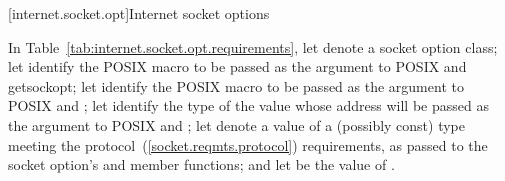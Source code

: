 [internet.socket.opt]{Internet socket options}

\pnum
In Table~\ref{tab:internet.socket.opt.requirements}, let  denote a socket option class; let  identify the POSIX macro to be passed as the  argument to POSIX  and getsockopt; let  identify the POSIX macro to be passed as the  argument to POSIX  and ; let  identify the type of the value whose address will be passed as the  argument to POSIX  and ;
let  denote a value of a (possibly const) type meeting the protocol~(\ref{socket.reqmts.protocol}) requirements,
as passed to the socket option's  and  member functions;
and let  be the value of .

